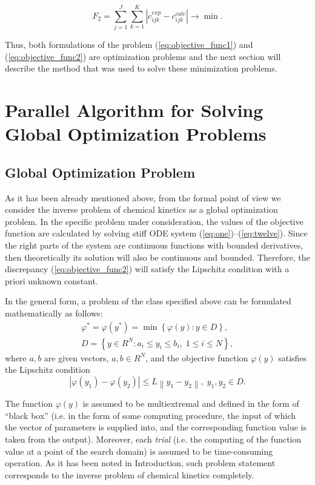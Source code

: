 \documentclass{svproc}
\begin{document}
\begin{equation}
  F_2 = \sum_{j=1}^J \sum_{k=1}^K \left| c_{ijk}^{exp} - c_{ijk}^{calc} \right| \longrightarrow \min.
  \label{eq:objective_func2} 
\end{equation}

Thus, both formulations of the problem (\ref{eq:objective_func1}) and (\ref{eq:objective_func2}) are optimization problems and the next section will describe the method that was used to solve these minimization problems.

\section{Parallel Algorithm for Solving Global Optimization Problems }\label{Sec_GSA}

\subsection{Global Optimization Problem}

As it has been already mentioned above, from the formal point of view we consider the inverse problem of chemical kinetics as a global optimization problem. 
In the specific problem under consideration, the values of the objective function are calculated by solving stiff ODE system (\ref{eq:one})--(\ref{eq:twelve}). Since the right parts of the system are continuous functions with bounded derivatives, then theoretically its solution will also be continuous and bounded. Therefore, the discrepancy (\ref{eq:objective_func2}) will satisfy the Lipschitz condition with a priori unknown constant.

In the general form, a problem of the class specified above can be formulated mathematically as 
follows:
\begin{gather}
 \varphi^* = \varphi(y^\ast)=\min{\left\{\varphi(y):y\in D\right\}}, \label{problemN}\\
 D=\left\{y\in R^N: a_i\leq y_i \leq b_i, \;  1\leq i \leq N\right\} \label{D},
\end{gather}
where $a,b$ are given vectors, $a,b\in R^N$, and the objective function $\varphi(y)$ satisfies the Lipschitz condition
\begin{equation}\label{Lip}
\left|\varphi(y_1)-\varphi(y_2)\right|\leq L\left\|y_1-y_2\right\|,\; y_1,y_2 \in D.
\end{equation}

The function $\varphi(y)$ is assumed to be multiextremal and defined in the form of ``black box'' (i.e. in the form of some computing procedure, the input of which the  vector of parameters is supplied into, and the corresponding function value is taken from the output). Moreover, each \textit{trial} (i.e. the computing of the function value at a point of the search domain) is assumed to be time-consuming operation. 
As it has been noted in Introduction, such problem statement corresponds to the inverse problem of chemical kinetics completely.
\end{document}
